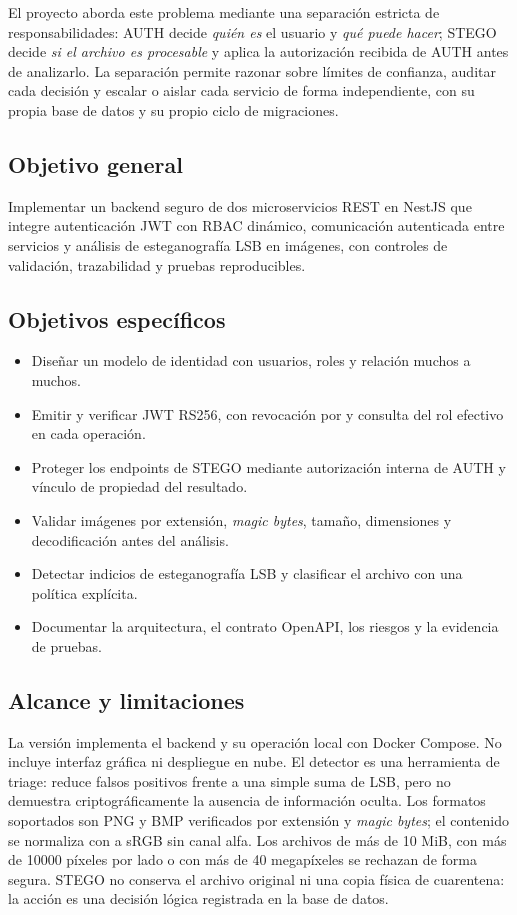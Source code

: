 \documentclass[11pt,a4paper]{article}
\newcommand{\code}[1]{\texttt{\detokenize{#1}}}
\newcommand{\term}[1]{\textit{#1}}
\begin{document}
El proyecto aborda este problema mediante una separación estricta de
responsabilidades: AUTH decide \emph{quién es} el usuario y \emph{qué puede hacer};
STEGO decide \emph{si el archivo es procesable} y aplica la autorización recibida
de AUTH antes de analizarlo. La separación permite razonar sobre límites de
confianza, auditar cada decisión y escalar o aislar cada servicio de forma
independiente, con su propia base de datos y su propio ciclo de migraciones.

\subsection{Objetivo general}

Implementar un backend seguro de dos microservicios REST en NestJS que integre
autenticación JWT con RBAC dinámico, comunicación autenticada entre servicios y
análisis de esteganografía LSB en imágenes, con controles de validación,
trazabilidad y pruebas reproducibles.

\subsection{Objetivos específicos}

\begin{itemize}[leftmargin=1.4em]
  \item Diseñar un modelo de identidad con usuarios, roles y relación muchos a muchos.
  \item Emitir y verificar JWT RS256, con revocación por \code{tokenVersion} y consulta del rol efectivo en cada operación.
  \item Proteger los endpoints de STEGO mediante autorización interna de AUTH y vínculo de propiedad del resultado.
  \item Validar imágenes por extensión, \term{magic bytes}, tamaño, dimensiones y decodificación antes del análisis.
  \item Detectar indicios de esteganografía LSB y clasificar el archivo con una política explícita.
  \item Documentar la arquitectura, el contrato OpenAPI, los riesgos y la evidencia de pruebas.
\end{itemize}

\subsection{Alcance y limitaciones}

La versión implementa el backend y su operación local con Docker Compose. No incluye
interfaz gráfica ni despliegue en nube. El detector es una herramienta de triage:
reduce falsos positivos frente a una simple suma de LSB, pero no demuestra
criptográficamente la ausencia de información oculta. Los formatos soportados son
PNG y BMP verificados por extensión y \term{magic bytes}; el contenido se normaliza
con \code{sharp} a sRGB sin canal alfa. Los archivos de más de 10 MiB, con más de
10000 píxeles por lado o con más de 40 megapíxeles se rechazan de forma segura.
STEGO no conserva el archivo original ni una copia física de cuarentena: la acción
\code{cuarentena} es una decisión lógica registrada en la base de datos.
\end{document}
